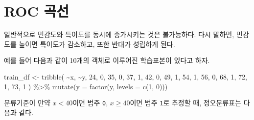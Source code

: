 \documentclass[
]{book}
\newenvironment{Shaded}{\begin{snugshade}}{\end{snugshade}}
\newcommand{\AttributeTok}[1]{\textcolor[rgb]{0.77,0.63,0.00}{#1}}
\newcommand{\DecValTok}[1]{\textcolor[rgb]{0.00,0.00,0.81}{#1}}
\newcommand{\FunctionTok}[1]{\textcolor[rgb]{0.00,0.00,0.00}{#1}}
\newcommand{\NormalTok}[1]{#1}
\newcommand{\OtherTok}[1]{\textcolor[rgb]{0.56,0.35,0.01}{#1}}
\newcommand{\SpecialCharTok}[1]{\textcolor[rgb]{0.00,0.00,0.00}{#1}}
\begin{document}
\hypertarget{roc-curve}{%
\section{ROC 곡선}\label{roc-curve}}

일반적으로 민감도와 특이도를 동시에 증가시키는 것은 불가능하다. 다시 말하면, 민감도를 높이면 특이도가 감소하고, 또한 반대가 성립하게 된다.

예를 들어 다음과 같이 10개의 객체로 이루어진 학습표본이 있다고 하자.

\begin{Shaded}
\begin{Highlighting}[]
\NormalTok{train\_df }\OtherTok{\textless{}{-}} \FunctionTok{tribble}\NormalTok{(}
  \SpecialCharTok{\textasciitilde{}}\NormalTok{x, }\SpecialCharTok{\textasciitilde{}}\NormalTok{y,}
  \DecValTok{24}\NormalTok{, }\DecValTok{0}\NormalTok{,}
  \DecValTok{35}\NormalTok{, }\DecValTok{0}\NormalTok{,}
  \DecValTok{37}\NormalTok{, }\DecValTok{1}\NormalTok{,}
  \DecValTok{42}\NormalTok{, }\DecValTok{0}\NormalTok{,}
  \DecValTok{49}\NormalTok{, }\DecValTok{1}\NormalTok{,}
  \DecValTok{54}\NormalTok{, }\DecValTok{1}\NormalTok{,}
  \DecValTok{56}\NormalTok{, }\DecValTok{0}\NormalTok{,}
  \DecValTok{68}\NormalTok{, }\DecValTok{1}\NormalTok{,}
  \DecValTok{72}\NormalTok{, }\DecValTok{1}\NormalTok{,}
  \DecValTok{73}\NormalTok{, }\DecValTok{1}
\NormalTok{) }\SpecialCharTok{\%\textgreater{}\%}
  \FunctionTok{mutate}\NormalTok{(}\AttributeTok{y =} \FunctionTok{factor}\NormalTok{(y, }\AttributeTok{levels =} \FunctionTok{c}\NormalTok{(}\DecValTok{1}\NormalTok{, }\DecValTok{0}\NormalTok{)))}
\end{Highlighting}
\end{Shaded}

분류기준이 만약 \(x < 40\)이면 범주 \texttt{0}, \(x \geq 40\)이면 범주 \texttt{1}로 추정할 때, 정오분류표는 다음과 같다.

\begin{Shaded}
\end{Shaded}
\end{document}
